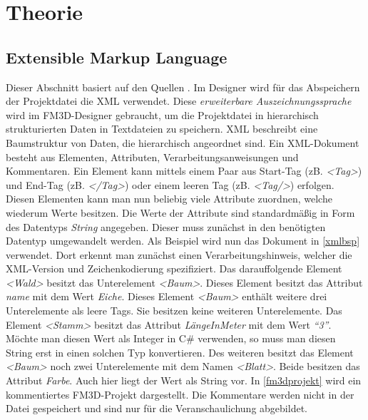 \chapter{Theorie}
\label{theorie}




\section[Extensible Markup Language]{Extensible Markup Language}
\label{extensiblemarkuplanguage}

Dieser Abschnitt basiert auf den Quellen  \cite{xml}\cite{xmlcstutorials}\cite{msdn}. Im Designer wird für das Abspeichern der Projektdatei die \ac{XML} verwendet.  Diese \textit{erweiterbare Auszeichnungssprache} wird im FM3D-Designer gebraucht, um die Projektdatei in hierarchisch strukturierten Daten in Textdateien zu speichern.
\ac{XML} beschreibt eine Baumstruktur von Daten, die hierarchisch angeordnet sind. Ein \ac{XML}-Dokument besteht aus Elementen, Attributen, Verarbeitungsanweisungen und Kommentaren. 
Ein Element kann mittels einem Paar aus Start-Tag (zB. \textit{<Tag>}) und End-Tag (zB. \textit{</Tag>}) oder einem leeren Tag (zB. \textit{<Tag/>}) erfolgen.
Diesen Elementen kann man nun beliebig viele Attribute zuordnen, welche wiederum Werte besitzen.
Die Werte der Attribute sind standardmäßig in Form des Datentyps \textit{String} angegeben. Dieser muss zunächst in den benötigten Datentyp umgewandelt werden.
Als Beispiel wird nun das Dokument in \cref{xmlbsp} verwendet. 
Dort erkennt man zunächst einen Verarbeitungshinweis, welcher die XML-Version und Zeichenkodierung spezifiziert. Das darauffolgende Element \textit{<Wald>} besitzt das Unterelement \textit{<Baum>}. Dieses Element besitzt das Attribut \textit{name} mit dem Wert \textit{Eiche}. 
Dieses Element \textit{<Baum>} enthält weitere drei Unterelemente als leere Tags. Sie besitzen keine weiteren Unterelemente. Das Element \textit{<Stamm>} besitzt das Attribut \textit{LängeInMeter} mit dem Wert \textit{"`3"'}. Möchte man diesen Wert als Integer in C\# verwenden, so muss man diesen String erst in einen solchen Typ konvertieren. Des weiteren besitzt das Element \textit{<Baum>} noch zwei Unterelemente mit dem Namen \textit{<Blatt>}. Beide besitzen das Attribut \textit{Farbe}. Auch hier liegt der Wert als String vor.
In \cref{fm3dprojekt} wird ein kommentiertes FM3D-Projekt dargestellt. Die Kommentare werden nicht in der Datei gespeichert und sind nur für die Veranschaulichung abgebildet.
